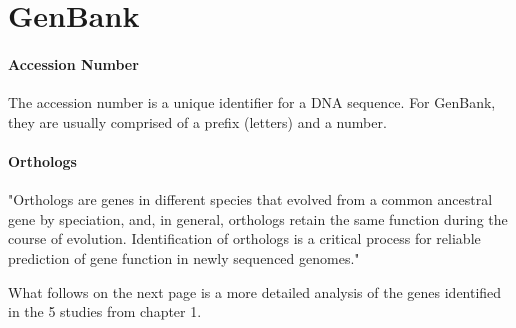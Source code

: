 \documentclass[12pt]{article}
\begin{document}
\section{GenBank}
\paragraph{Accession Number} The accession number is a unique identifier for a DNA sequence.
For GenBank, they are usually comprised of a prefix (letters) and a number.\cite{accno}

\paragraph{Orthologs}"Orthologs are genes in different species
that evolved from a common ancestral gene by speciation, and, in general, orthologs retain the same function during the course of evolution. Identification of orthologs is a critical process for reliable prediction of gene function in newly sequenced genomes." \cite{ortho}

What follows on the next page is a more detailed analysis of the genes identified in the 5 studies from chapter 1.
\end{document}
